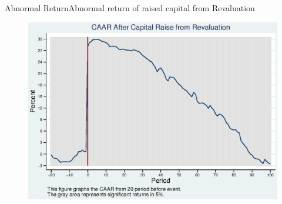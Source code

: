 \documentclass{beamer}
\begin{document}
%





\begin{frame}{Abnormal Return}{Abnormal return of raised capital from Revaluation}
\label{abreturnrevalution}
\begin{figure}
\centering
\includegraphics[width=0.65\linewidth]{Output/CARRevaluation.eps}
\label{fig:abreturnrevalution}
\end{figure}

\hfill\hyperlink{abreturnrevalution4Factor}{}
\end{frame}
\end{document}
